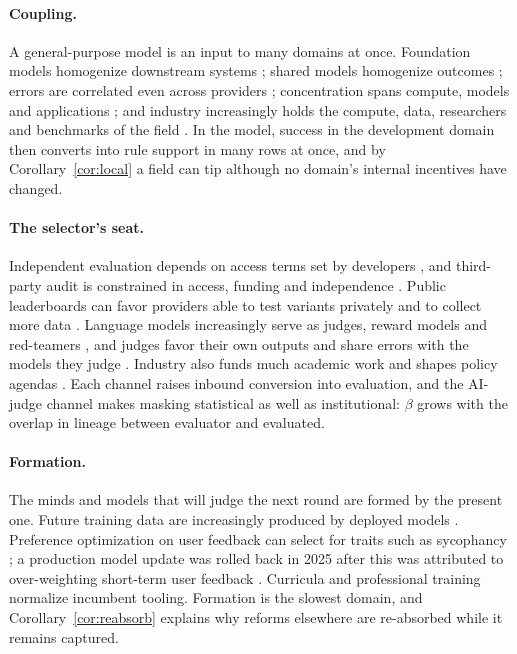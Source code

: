 \documentclass[letterpaper]{article} %
\theoremstyle{definition}
\begin{document}
\paragraph{Coupling.} A general-purpose model is an input to many domains at once. Foundation models homogenize downstream systems \citep{bommasani2021}; shared models homogenize outcomes \citep{kleinberg2021,bommasani2022}; errors are correlated even across providers \citep{kim2025}; concentration spans compute, models and applications \citep{narechania2024}; and industry increasingly holds the compute, data, researchers and benchmarks of the field \citep{ahmed2023}. In the model, success in the development domain then converts into rule support in many rows at once, and by Corollary~\ref{cor:local} a field can tip although no domain's internal incentives have changed.

\paragraph{The selector's seat.} Independent evaluation depends on access terms set by developers \citep{longpre2024}, and third-party audit is constrained in access, funding and independence \citep{raji2022,costanzachock2022,birhane2024}. Public leaderboards can favor providers able to test variants privately and to collect more data \citep{singh2025}. Language models increasingly serve as judges, reward models and red-teamers \citep{zheng2023,perez2022}, and judges favor their own outputs \citep{panickssery2024} and share errors with the models they judge \citep{kim2025}. Industry also funds much academic work \citep{abdalla2021} and shapes policy agendas \citep{wei2024}. Each channel raises inbound conversion into evaluation, and the AI-judge channel makes masking statistical as well as institutional: $\beta$ grows with the overlap in lineage between evaluator and evaluated.

\paragraph{Formation.} The minds and models that will judge the next round are formed by the present one. Future training data are increasingly produced by deployed models \citep{shumailov2024,taori2023}. Preference optimization on user feedback can select for traits such as sycophancy \citep{sharma2024}; a production model update was rolled back in 2025 after this was attributed to over-weighting short-term user feedback \citep{openai2025}. Curricula and professional training normalize incumbent tooling. Formation is the slowest domain, and Corollary~\ref{cor:reabsorb} explains why reforms elsewhere are re-absorbed while it remains captured.
\end{document}
